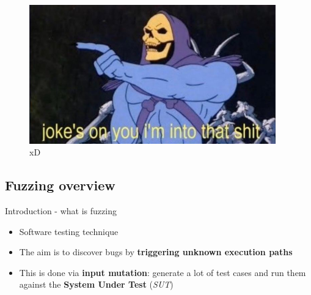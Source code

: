 \documentclass[xcolor=dvipsnames, 12pt]{beamer}
\begin{document}
\begin{frame}
        \begin{figure}
                \begin{center}
                        \includegraphics[width=0.95\textwidth]{assets/jokes_2.jpg}
                \end{center}
                \caption{xD}
        \end{figure}
\end{frame}

\begin{NoHyper}
\begin{frame}
        \section{Fuzzing overview}
        \sectionpage
\end{frame}
\end{NoHyper}

\begin{frame}{Introduction - what is fuzzing}
        \begin{itemize}
                \item Software testing technique
                \item The aim is to discover bugs by \textbf{triggering unknown execution paths}
                \item This is done via \textbf{input mutation}: generate a lot of test cases and run them against the \textbf{System Under Test} (\textit{SUT}) 
        \end{itemize}
\end{frame}
\end{document}
